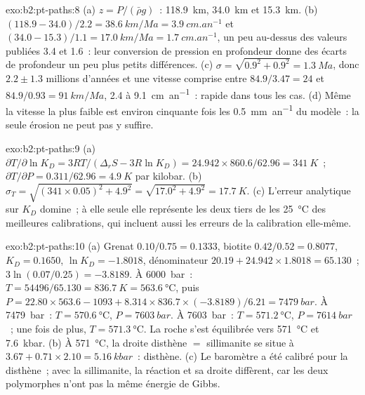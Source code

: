 \begin{solution}{exo:b2:pt-paths:8}
(a) $z = P/(\bar\rho g)$~: \qty{118.9}{km}, \qty{34.0}{km} et \qty{15.3}{km}.
(b) $(118.9 - 34.0)/2.2 = \qty{38.6}{km/Ma} = \qty{3.9}{cm.an^{-1}}$ et $(34.0 -
15.3)/1.1 = \qty{17.0}{km/Ma} = \qty{1.7}{cm.an^{-1}}$, un peu au-dessus des valeurs publiées
3.4 et 1.6~: leur conversion de pression en profondeur donne des écarts de profondeur un peu plus petits
différences. (c) $\sigma = \sqrt{0.9^2 + 0.9^2} = \qty{1.3}{Ma}$, donc $2.2 \pm 1.3$
millions d'années et une vitesse comprise entre $84.9/3.47 = 24$ et $84.9/0.93 = \qty{91}{km/Ma}$,
2.4 à \qty{9.1}{cm.an^{-1}}~: rapide dans tous les cas. (d) Même la vitesse la plus faible est environ cinquante fois
les \qty{0.5}{mm.an^{-1}} du modèle~: la seule érosion ne peut pas y suffire.
\end{solution}

\begin{solution}{exo:b2:pt-paths:9}
(a) $\partial T/\partial\ln K_D = 3RT/(\Delta_r S - 3R\ln K_D) = 24.942\times860.6/62.96 =
\qty{341}{K}$~; $\partial T/\partial P = 0.311/62.96 = \qty{4.9}{K}$ par kilobar.
(b) $\sigma_T = \sqrt{(341\times0.05)^2 + 4.9^2} = \sqrt{17.0^2 + 4.9^2} =
\qty{17.7}{K}$. (c) L'erreur analytique sur $K_D$ domine~; à elle seule elle représente les deux tiers de
les \qty{25}{\celsius} des meilleures calibrations, qui incluent aussi les erreurs de la
calibration elle-même.
\end{solution}

\begin{solution}{exo:b2:pt-paths:10}
(a) Grenat $0.10/0.75 = 0.1333$, biotite $0.42/0.52 = 0.8077$, $K_D = 0.1650$, $\ln K_D =
-1.8018$, dénominateur $20.19 + 24.942\times1.8018 = 65.130$~; $3\ln(0.07/0.25) = -3.8189$.
À \qty{6000}{bar}~: $T = 54496/65.130 = \qty{836.7}{K} = \qty{563.6}{\celsius}$, puis $P
= 22.80\times563.6 - 1093 + 8.314\times836.7\times(-3.8189)/6.21 = \qty{7479}{bar}$.
À \qty{7479}{bar}~: $T = \qty{570.6}{\celsius}$, $P = \qty{7603}{bar}$. À
\qty{7603}{bar}~: $T = \qty{571.2}{\celsius}$, $P = \qty{7614}{bar}$~; une fois de plus, $T =
\qty{571.3}{\celsius}$. La roche s'est équilibrée vers \qty{571}{\celsius} et
\qty{7.6}{kbar}. (b) À \qty{571}{\celsius}, la droite disthène $=$ sillimanite se situe à $3.67
+ 0.71\times2.10 = \qty{5.16}{kbar}$~: disthène. (c) Le baromètre a été calibré pour
la disthène~; avec la sillimanite, la réaction et sa droite diffèrent, car les deux polymorphes n'ont pas
la même énergie de Gibbs.
\end{solution}

